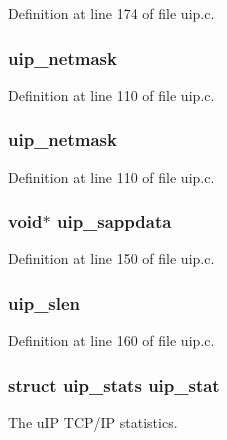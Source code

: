 Definition at line 174 of file uip.c.

\hypertarget{group__uip_ga3237be0d9ec457de0177689ee23c0d5c}{
\subsubsection[{uip\_\-netmask}]{ {\bf uip\_\-netmask}}}
\label{group__uip_ga3237be0d9ec457de0177689ee23c0d5c}


Definition at line 110 of file uip.c.

\hypertarget{group__uip_ga3237be0d9ec457de0177689ee23c0d5c}{
\subsubsection[{uip\_\-netmask}]{ {\bf uip\_\-netmask}}}
\label{group__uip_ga3237be0d9ec457de0177689ee23c0d5c}


Definition at line 110 of file uip.c.

\hypertarget{group__uip_gaa05a3dde2048480fa3ab2a5961898d18}{
\subsubsection[{uip\_\-sappdata}]{\setlength{\rightskip}{0pt plus 5cm}void$\ast$ {\bf uip\_\-sappdata}}}
\label{group__uip_gaa05a3dde2048480fa3ab2a5961898d18}


Definition at line 150 of file uip.c.

\hypertarget{group__uip_ga5b5615dc240daed20949c0fded2b4679}{
\subsubsection[{uip\_\-slen}]{ {\bf uip\_\-slen}}}
\label{group__uip_ga5b5615dc240daed20949c0fded2b4679}


Definition at line 160 of file uip.c.

\hypertarget{group__uip_ga9ee50a40597e67fce96541ab56c3b712}{
\subsubsection[{uip\_\-stat}]{\setlength{\rightskip}{0pt plus 5cm}struct {\bf uip\_\-stats} {\bf uip\_\-stat}}}
\label{group__uip_ga9ee50a40597e67fce96541ab56c3b712}
The uIP TCP/IP statistics.

